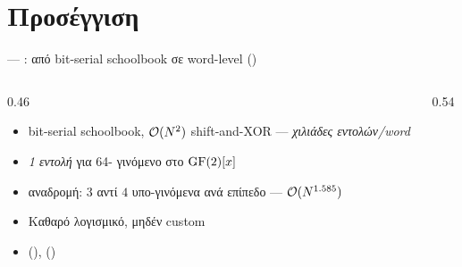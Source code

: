 \section{Προσέγγιση}

\begin{frame}{ — \Zbc \clmul: από bit-serial schoolbook σε word-level ()}
  \begin{columns}[T]
    \begin{column}{0.46\textwidth}
      \begin{itemize}
        \item {} bit-serial schoolbook, $\mathcal{O}(N^2)$ shift-and-XOR — \emph{χιλιάδες εντολών/word}
        \item \pos{\Zbc \clmul/\clmulh:} \emph{1 εντολή} για 64-  γινόμενο στο $\mathrm{GF}(2)[x]$
        \item {} αναδρομή: $3$ αντί $4$ υπο-γινόμενα ανά επίπεδο — $\mathcal{O}(N^{1.585})$
        \item Καθαρό λογισμικό, μηδέν custom 
        \item {} (),  ()
      \end{itemize}
    \end{column}
    \begin{column}{0.54\textwidth}
      \centering
      \resizebox{\columnwidth}{!}{%
      }
    \end{column}
  \end{columns}
\end{frame}

